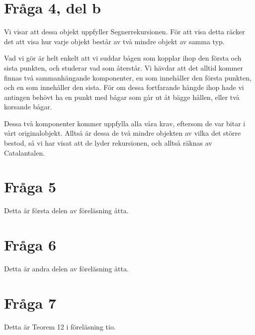 \documentclass[nobib]{tufte-handout}
\begin{document}
\section{Fråga 4, del b}

Vi visar att dessa objekt uppfyller Segnerrekursionen. För att visa detta räcker det att visa hur varje objekt består av två mindre objekt av samma typ.

Vad vi gör är helt enkelt att vi suddar bågen som kopplar ihop den första och sista punkten, och studerar vad som återstår. Vi hävdar att det alltid kommer finnas två sammanhängande komponenter, en som innehåller den första punkten, och en som innehåller den sista. För om dessa fortfarande hängde ihop hade vi antingen behövt ha en punkt med bågar som går ut åt bägge hållen, eller två korsande bågar.

Dessa två komponenter kommer uppfylla alla våra krav, eftersom de var bitar i vårt originalobjekt. Alltså är dessa de två mindre objekten av vilka det större bestod, så vi har visat att de lyder rekursionen, och alltså räknas av Catalantalen.

\section{Fråga 5}

Detta är första delen av föreläsning åtta.

\section{Fråga 6}

Detta är andra delen av föreläsning åtta.

\section{Fråga 7}

Detta är Teorem 12 i föreläsning tio.

%
%
\end{document}
